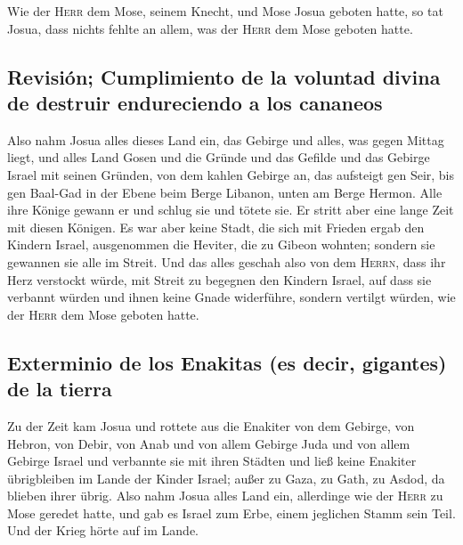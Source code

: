  Wie der \textsc{Herr} dem Mose, seinem Knecht, und Mose
Josua geboten hatte, so tat Josua, dass nichts fehlte an allem, was der
\textsc{Herr} dem Mose geboten hatte.

\hypertarget{revisiuxf3n-cumplimiento-de-la-voluntad-divina-de-destruir-endureciendo-a-los-cananeos}{%
\subsection{Revisión; Cumplimiento de la voluntad divina de destruir
endureciendo a los
cananeos}\label{revisiuxf3n-cumplimiento-de-la-voluntad-divina-de-destruir-endureciendo-a-los-cananeos}}

 Also nahm Josua alles dieses Land ein, das Gebirge und
alles, was gegen Mittag liegt, und alles Land Gosen und die Gründe und
das Gefilde und das Gebirge Israel mit seinen Gründen, 
von dem kahlen Gebirge an, das aufsteigt gen Seir, bis gen Baal-Gad in
der Ebene beim Berge Libanon, unten am Berge Hermon. Alle ihre Könige
gewann er und schlug sie und tötete sie.  Er stritt aber
eine lange Zeit mit diesen Königen.  Es war aber keine
Stadt, die sich mit Frieden ergab den Kindern Israel, ausgenommen die
Heviter, die zu Gibeon wohnten; sondern sie gewannen sie alle im Streit.
 Und das alles geschah also von dem \textsc{Herrn}, dass
ihr Herz verstockt würde, mit Streit zu begegnen den Kindern Israel, auf
dass sie verbannt würden und ihnen keine Gnade widerführe, sondern
vertilgt würden, wie der \textsc{Herr} dem Mose geboten hatte.

\hypertarget{exterminio-de-los-enakitas-es-decir-gigantes-de-la-tierra}{%
\subsection{Exterminio de los Enakitas (es decir, gigantes) de la
tierra}\label{exterminio-de-los-enakitas-es-decir-gigantes-de-la-tierra}}

 Zu der Zeit kam Josua und rottete aus die Enakiter von
dem Gebirge, von Hebron, von Debir, von Anab und von allem Gebirge Juda
und von allem Gebirge Israel und verbannte sie mit ihren Städten
 und ließ keine Enakiter übrigbleiben im Lande der Kinder
Israel; außer zu Gaza, zu Gath, zu Asdod, da blieben ihrer übrig.
 Also nahm Josua alles Land ein, allerdinge wie der
\textsc{Herr} zu Mose geredet hatte, und gab es Israel zum Erbe, einem
jeglichen Stamm sein Teil. Und der Krieg hörte auf im Lande.

